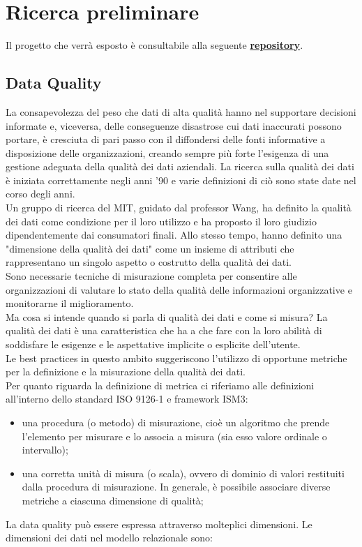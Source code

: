 \documentclass[a4paper,12pt]{article}
\begin{document}
\tableofcontents

\newpage

\section{Ricerca preliminare} 

Il progetto che verrà esposto è consultabile alla seguente \href{https://github.com/ivemberg/Data_quality_experimentation}{\textbf{repository}}.

\subsection{Data Quality}

La consapevolezza del peso che dati di alta qualità hanno nel supportare decisioni informate e, viceversa, delle conseguenze disastrose cui dati inaccurati possono portare, è cresciuta di pari passo con il diffondersi delle fonti informative a disposizione delle organizzazioni, creando sempre più forte l’esigenza di una gestione adeguata della qualità dei dati aziendali. La ricerca sulla qualità dei dati è iniziata correttamente negli anni '90 e varie definizioni di ciò sono state date nel corso degli anni. \\
\noindent Un gruppo di ricerca del MIT, guidato dal professor Wang, ha definito la qualità dei dati come condizione per il loro utilizzo e ha proposto il loro giudizio dipendentemente dai consumatori finali. Allo stesso tempo, hanno definito una "dimensione della qualità dei dati" come un insieme di attributi che rappresentano un singolo aspetto o costrutto della qualità dei dati. \\
\noindent Sono necessarie tecniche di misurazione completa per consentire alle organizzazioni di valutare lo stato della qualità delle informazioni organizzative e monitorarne il miglioramento. \\
\noindent Ma cosa si intende quando si parla di qualità dei dati e come si misura? La qualità dei dati è una caratteristica che ha a che fare con la loro abilità di soddisfare le esigenze e le aspettative implicite o esplicite dell'utente. \\
\noindent Le best practices in questo ambito suggeriscono l’utilizzo di opportune metriche per la definizione e la misurazione della qualità dei dati. \\
\noindent Per quanto riguarda la definizione di metrica ci riferiamo alle definizioni all'interno dello standard ISO 9126-1 e framework ISM3:
\begin{itemize}
	\item una procedura (o metodo) di misurazione, cioè un algoritmo che prende l'elemento per misurare e lo associa a misura (sia esso valore ordinale o intervallo); 
	\item una corretta unità di misura (o scala), ovvero di dominio di valori restituiti dalla procedura di misurazione. In generale, è possibile associare diverse metriche a ciascuna dimensione di qualità;
\end{itemize} 
La data quality può essere espressa attraverso molteplici dimensioni. Le dimensioni dei dati nel modello relazionale sono:
\end{document}
